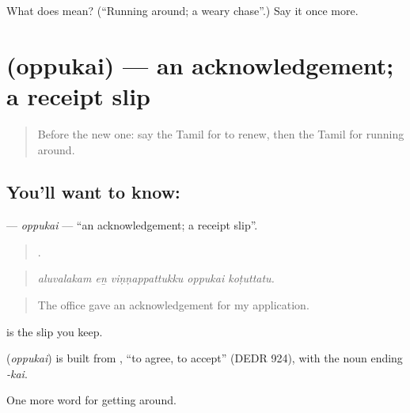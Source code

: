 \begin{tcolorbox}[breakable,colback=teal!4,colframe=teal!35!black,title={Before you move on}]
What does  mean? (\textquotedblleft{}Running around; a weary chase\textquotedblright{}.) Say it once more.
\end{tcolorbox}
\section[\texorpdfstring{\ta{ஒப்புகை} (oppukai)}{ஒப்புகை (oppukai)}]{ (oppukai) — an acknowledgement; a receipt slip}

\label{lesson:TA-C415-oppukai}



\begin{quote}
Before the new one: say the Tamil for to renew, then the Tamil for running around.
\end{quote}

\subsection*{You'll want to know: }
\textbf{} — \emph{oppukai} — \textquotedblleft{}an acknowledgement; a receipt slip\textquotedblright{}.

\begin{quote}
    .
\end{quote}

\begin{quote}
\emph{aluvalakam eṉ viṇṇappattukku oppukai koṭuttatu.}
\end{quote}

\begin{quote}
The office gave an acknowledgement for my application.
\end{quote}

  is the slip you keep.

\begin{cousinweb}
\textbf{} (\emph{oppukai}) is built from , \textquotedblleft{}to agree, to accept\textquotedblright{} (DEDR 924), with the noun ending \emph{-kai}.
\end{cousinweb}

\begin{grammarlens}[title={What you've built}]
One more word for getting around.
\end{grammarlens}

